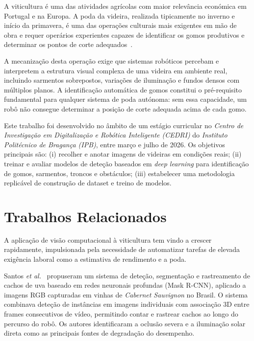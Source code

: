 \documentclass[12pt, a4paper]{article}
\begin{document}
A viticultura é uma das atividades agrícolas com maior relevância económica
em Portugal e na Europa. A poda da videira, realizada tipicamente no inverno
e início da primavera, é uma das operações culturais mais exigentes em mão
de obra e requer operários experientes capazes de identificar os gomos
produtivos e determinar os pontos de corte adequados~\cite{botterill2017robot}.

A mecanização desta operação exige que sistemas robóticos percebam e
interpretem a estrutura visual complexa de uma videira em ambiente real,
incluindo sarmentos sobrepostos, variações de iluminação e fundos densos
com múltiplos planos. A identificação automática de gomos constitui o
pré-requisito fundamental para qualquer sistema de poda autónoma: sem essa
capacidade, um robô não consegue determinar a posição de corte adequada
acima de cada gomo.

Este trabalho foi desenvolvido no âmbito de um estágio curricular no
\textit{Centro de Investigação em Digitalização e Robótica Inteligente
(CEDRI)} do \textit{Instituto Politécnico de Bragança (IPB)}, entre março
e julho de 2026. Os objetivos principais são: (i) recolher e anotar imagens
de videiras em condições reais; (ii) treinar e avaliar modelos de deteção
baseados em \textit{deep learning} para identificação de gomos,
sarmentos, troncos e obstáculos; (iii) estabelecer uma metodologia
replicável de construção de dataset e treino de modelos.

\section{Trabalhos Relacionados}

A aplicação de visão computacional à viticultura tem vindo a crescer
rapidamente, impulsionada pela necessidade de automatizar tarefas de elevada
exigência laboral como a estimativa de rendimento e a poda.

Santos \textit{et al.}~\cite{santos2020grape} propuseram um sistema de
deteção, segmentação e rastreamento de cachos de uva baseado em redes
neuronais profundas (Mask R-CNN), aplicado a imagens RGB capturadas em
vinhas de \textit{Cabernet Sauvignon} no Brasil. O sistema combinava
deteção de instâncias em imagens individuais com associação 3D entre
frames consecutivos de vídeo, permitindo contar e rastrear cachos ao longo
do percurso do robô. Os autores identificaram a oclusão severa e a
iluminação solar direta como as principais fontes de degradação do
desempenho.
\end{document}
